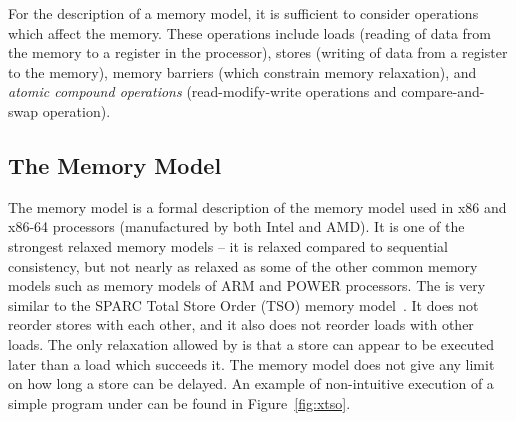 For the description of a memory model, it is sufficient to consider operations
which affect the memory.
These operations include loads (reading of data from the memory to a register
in the processor), stores (writing of data from a register to the memory),
memory barriers (which constrain memory relaxation), and \emph{atomic compound
operations} (read-modify-write operations and compare-and-swap operation).

\subsection{The \xtso Memory Model}


The \xtso memory model is a formal description of the memory model used in x86
and x86-64 processors (manufactured by both Intel and AMD).
It is one of the strongest relaxed memory models -- it is relaxed compared to
sequential consistency, but not nearly as relaxed as some of the other common
memory models such as memory models of ARM and POWER processors.
The \xtso is very similar to the SPARC Total Store Order (TSO) memory
model~\cite{SPARC94}.
It does not reorder stores with each other, and it also does not reorder loads
with other loads.
The only relaxation allowed by \xtso is that a store can appear to be executed
later than a load which succeeds it.
The memory model does not give any limit on how long a store can be delayed.
An example of non-intuitive execution of a simple program under \xtso can be
found in Figure~\ref{fig:xtso}.

